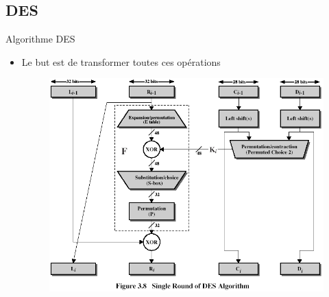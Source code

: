 \documentclass{beamer}
\begin{document}
\subsection{DES}
\begin{frame}{Algorithme DES}
  \begin{itemize}
  \item Le but est de transformer toutes ces opérations
    \begin{figure}[h]
      \centering
      \includegraphics[scale=0.45]{./images/des_slides.png}
      \label{fig:DES-round}
    \end{figure}
  \end{itemize}

\end{frame}
\end{document}
